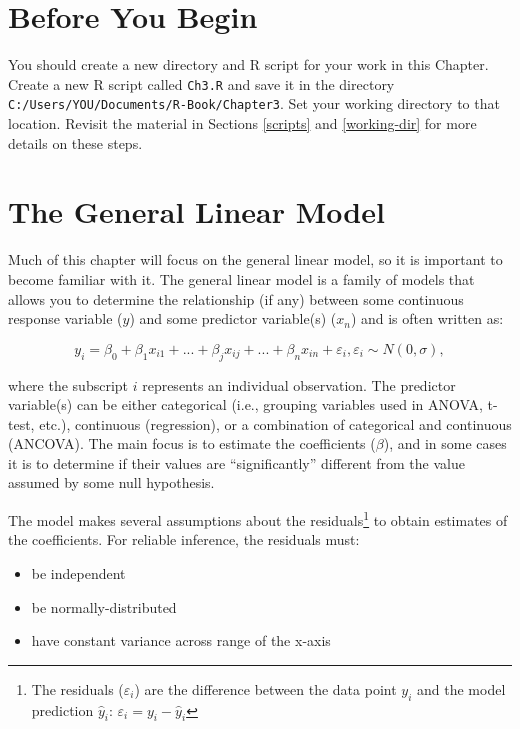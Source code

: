 \documentclass[]{book}
\providecommand{\tightlist}{%
  \setlength{\itemsep}{0pt}\setlength{\parskip}{0pt}}
\let\rmarkdownfootnote\footnote%
\def\footnote{\protect\rmarkdownfootnote}
\theoremstyle{definition}
\theoremstyle{definition}
\theoremstyle{definition}
\theoremstyle{remark}
\begin{document}
\section*{Before You Begin}\label{before-you-begin-1}

You should create a new directory and R script for your work in this
Chapter. Create a new R script called \texttt{Ch3.R} and save it in the
directory \texttt{C:/Users/YOU/Documents/R-Book/Chapter3}. Set your
working directory to that location. Revisit the material in Sections
\ref{scripts} and \ref{working-dir} for more details on these steps.

\section{The General Linear Model}\label{the-general-linear-model}

Much of this chapter will focus on the general linear model, so it is
important to become familiar with it. The general linear model is a
family of models that allows you to determine the relationship (if any)
between some continuous response variable (\(y\)) and some predictor
variable(s) (\(x_n\)) and is often written as:

\begin{equation}
  y_i=\beta_0 + \beta_1 x_{i1} + ... + \beta_j x_{ij}+ ... + \beta_n x_{in} + \varepsilon_i, \varepsilon_i \sim N(0,\sigma),
\label{eq:lin-mod}
\end{equation}

where the subscript \(i\) represents an individual observation. The
predictor variable(s) can be either categorical (i.e., grouping
variables used in ANOVA, t-test, etc.), continuous (regression), or a
combination of categorical and continuous (ANCOVA). The main focus is to
estimate the coefficients (\(\beta\)), and in some cases it is to
determine if their values are ``significantly'' different from the value
assumed by some null hypothesis.

The model makes several assumptions about the residuals\footnote{The
  residuals (\(\varepsilon_i\)) are the difference between the data
  point \(y_i\) and the model prediction \(\hat{y}_i\):
  \(\varepsilon_i=y_i-\hat{y}_i\)} to obtain estimates of the
coefficients. For reliable inference, the residuals must:

\begin{itemize}
\tightlist
\item
  be independent
\item
  be normally-distributed
\item
  have constant variance across range of the x-axis
\end{itemize}
\end{document}
